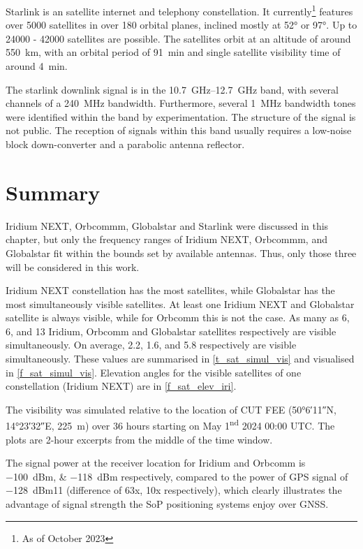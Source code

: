 Starlink is an satellite internet and telephony constellation. It currently\footnote{As of October 2023} features over \num{5000} satellites in over 180 orbital planes, inclined mostly at \ang{52} or \ang{97}. Up to 24000 - 42000 satellites are possible\cite{sop02}. The satellites orbit at an altitude of around \qty{550}{km}, with an orbital period of \qty{91}{min} and single satellite visibility time of around \qty{4}{min}.

The starlink downlink signal is in the \qtyrange{10.7}{12.7}{GHz} band, with several channels of a \qty{240}{MHz} bandwidth. Furthermore, several \qty{1}{MHz} bandwidth tones were identified within the band by experimentation. The structure of the signal is not public. The reception of signals within this band usually requires a low-noise block down-converter and a parabolic antenna reflector\cite{sop04}.

\section{Summary}
Iridium NEXT, Orbcommm, Globalstar and Starlink were discussed in this chapter, but only the frequency ranges of Iridium NEXT, Orbcommm, and Globalstar fit within the bounds set by available antennas. Thus, only those three will be considered in this work.

Iridium NEXT constellation has the most satellites, while Globalstar has the most simultaneously visible satellites. At least one Iridium NEXT and Globalstar satellite is always visible, while for Orbcomm this is not the case. As many as 6, 6, and 13 Iridium, Orbcomm and Globalstar satellites respectively are visible simultaneously. On average, 2.2, 1.6, and 5.8 respectively are visible simultaneously. These values are summarised in \autoref{t_sat_simul_vis} and visualised in \autoref{f_sat_simul_vis}. Elevation angles for the visible satellites of one constellation (Iridium NEXT) are in \autoref{f_sat_elev_iri}.

The visibility was simulated relative to the location of CUT FEE (\ang{50;6;11}N, \ang{14;23;32}E, \qty{225}{m}) over 36 hours starting on May 1\textsuperscript{nd} 2024 00:00 UTC. The plots are 2-hour excerpts from the middle of the time window.

The signal power at the receiver location for Iridium and Orbcomm is \qtylist{-100;-118}{dBm} respectively, compared to the power of GPS signal of \qty{-128}{dBm}\citep{pos04}{11} (difference of 63x, 10x respectively), which clearly illustrates the advantage of signal strength the SoP positioning systems enjoy over GNSS.

